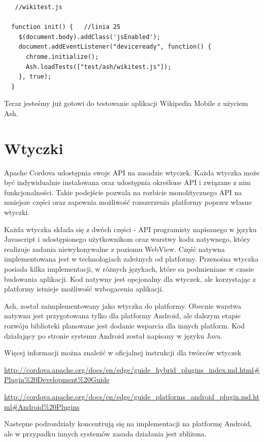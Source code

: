 \documentclass[brudnopis]{xmgr}
\begin{document}
\begin{lstlisting}
   //wikitest.js

  function init() {   //linia 25
    $(document.body).addClass('jsEnabled');
    document.addEventListener("deviceready", function() {
      chrome.initialize(); 
      Ash.loadTests(["test/ash/wikitest.js"]);
    }, true);
  }
\end{lstlisting}

Teraz jesteśmy już gotowi do testowanie aplikacji Wikipedia Mobile z użyciem Ash.

\chapter{Wtyczki}

Apache Cordova udostępnia swoje API na zasadzie wtyczek. Każda wtyczka może być indywidualnie instalowana oraz udostępnia określone API i związane z nim funkcjonalności. Takie podejście pozwala na rozbicie monolitycznego API na mniejsze części oraz zapewnia możliwość rozszerzenia platformy poprzez własne wtyczki.

Każda wtyczka składa się z dwóch części - API programisty napisanego w języku Javascript i udostępionego użytkownikom oraz warstwy kodu natywnego, który realizuje zadania niewykonywalne z poziomu WebView. Część natywna implementowana jest w technologiach zależnych od platformy. Przenośna wtyczka posiada kilka implementacji, w różnych językach, które sa podmieniane w czasie budowania aplikacji. Kod natywny jest opcjonalny dla wtyczek, ale korzystając z platformy istnieje możliwość wzbogacenia aplikacji.

Ash, został zaimplementowany jako wtyczka do platformy. Obecnie warstwa natywna jest przygotowana tylko dla platformy Android, ale dalszym etapie rozwóju biblioteki planowane jest dodanie wsparcia dla innych platform. Kod działający po stronie systemu Android został napisany w języku Java.

Więcej informacji można znaleźć w oficjalnej instrukcji dla twórców wtyczek

\url{http://cordova.apache.org/docs/en/edge/guide\_hybrid\_plugins\_index.md.html\#Plugin\%20Development\%20Guide}  

\url{http://cordova.apache.org/docs/en/edge/guide\_platforms\_android\_plugin.md.html\#Android\%20Plugins}   

Nastepne podrozdziały koncentrują się na implementacji na platformę Android, ale w przypadku innych systemów zasada działania jest zbliżona.
\end{document}
